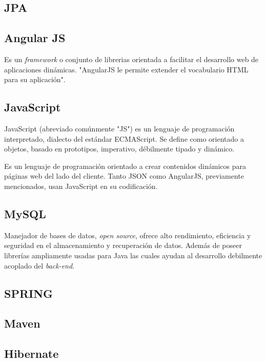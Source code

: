         \subsection{JPA}
        
        \subsection{Angular JS}
        
        Es un \textit{framework} o conjunto de librerias orientada a facilitar el desarrollo web de aplicaciones dinámicas. "AngularJS le permite extender el vocabulario HTML para su aplicación"\cite{ANGULARJS-angularjs}.
        
        \subsection{JavaScript}
        
        JavaScript (abreviado comúnmente "JS") es un lenguaje de programación interpretado, dialecto del estándar ECMAScript. Se define como orientado a objetos, basado en prototipos, imperativo, débilmente tipado y dinámico\cite{JAVASCRIPT-wiki}.
        
        Es un lenguaje de programación orientado a crear contenidos dinámicos para páginas web del lado del cliente. Tanto JSON como AngularJS, previamente mencionados, usan JavaScript en su codificación.
        
        \subsection{MySQL}
        
        Manejador de bases de datos, \textit{open source}, ofrece alto rendimiento, eficiencia y seguridad en el almacenamiento y recuperación de datos\cite{MYSQL-oracle}. Además de poseer librerías ampliamente usadas para Java las cuales ayudan al desarrollo debilmente acoplado del \textit{back-end}.
        
        \subsection{SPRING}
        
        \subsection{Maven}
        
        \subsection{Hibernate}
        
